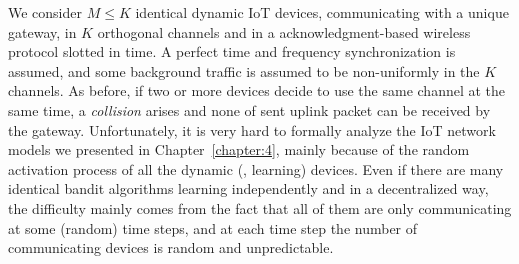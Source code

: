

We consider $M \leq K$ identical dynamic IoT devices, communicating with a unique gateway, in $K$ orthogonal channels and in a acknowledgment-based wireless protocol slotted in time.
A perfect time and frequency synchronization is assumed,
and some \iid{} background traffic is assumed to be non-uniformly in the $K$ channels.
As before, if two or more devices decide to use the same channel at the same time, a \emph{collision} arises and none of sent uplink packet can be received by the gateway.
%
Unfortunately, it is very hard to formally analyze the IoT network models we presented in Chapter~\ref{chapter:4}, mainly because of the random activation process of all the dynamic (\ie, learning) devices.
Even if there are many identical bandit algorithms learning independently and in a decentralized way, the difficulty mainly comes from the fact that all of them are only communicating at some (random) time steps, and at each time step the number of communicating devices is random and unpredictable.


